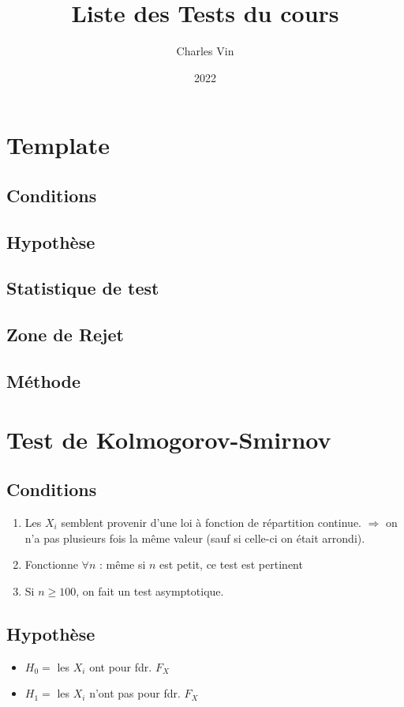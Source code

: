 \documentclass{article}
\title{Liste des Tests du cours}
\author{Charles Vin}
\date{2022}
\theoremstyle{plain}%
\theoremstyle{definition}
\theoremstyle{remark}
\begin{document}
\maketitle
\tableofcontents

\section{Template}
\subsection*{Conditions}
\subsection*{Hypothèse}
\subsection*{Statistique de test}
\subsection*{Zone de Rejet}
\subsection*{Méthode}

\section{Test de Kolmogorov-Smirnov}


\subsection*{Conditions}
\begin{enumerate}
    \item Les $ X_i $ semblent provenir d'une loi à fonction de répartition continue. $ \Rightarrow  $ on n'a pas plusieurs fois la même valeur (sauf si celle-ci on était arrondi).\\
    \item Fonctionne $ \forall n $ : même si $ n $ est petit, ce test est pertinent
    \item Si $ n \geq 100 $, on fait un test asymptotique.
\end{enumerate}

\subsection*{Hypothèse}
\begin{itemize}
    \item $ H_0 = $ les $ X_i $ ont pour fdr. $ F_X $ 
    \item $ H_1 = $ les $ X_i $ n'ont pas pour fdr. $ F_X $ 
\end{itemize}
\end{document}
